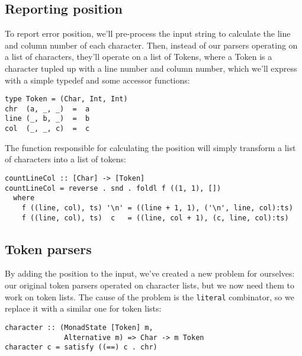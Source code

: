 \documentclass{tmr}
\begin{document}
\subsection{Reporting position}
To report error position, we'll pre-process the input
string to calculate the line and column number of each character.  Then, instead 
of our parsers operating on a list of characters, they'll operate on a list of 
Tokens, where a Token is a character tupled up with a line number and column 
number, which we'll express with a simple typedef and some accessor functions:
\begin{verbatim}
type Token = (Char, Int, Int)
chr  (a, _, _)  =  a
line (_, b, _)  =  b
col  (_, _, c)  =  c
\end{verbatim}
The function responsible for calculating the position will simply transform a 
list of characters into a list of tokens:
\begin{verbatim}
countLineCol :: [Char] -> [Token]
countLineCol = reverse . snd . foldl f ((1, 1), [])
  where
    f ((line, col), ts) '\n' = ((line + 1, 1), ('\n', line, col):ts)
    f ((line, col), ts)  c   = ((line, col + 1), (c, line, col):ts)
\end{verbatim}

\subsection{Token parsers}
By adding the position to the input, we've created a new problem 
for ourselves: our original token parsers operated on 
character lists, but we now need them to work on token lists.  
The cause of the problem is the \verb+literal+ combinator, so we
replace it with a similar one for token lists:
\begin{verbatim}
character :: (MonadState [Token] m, 
              Alternative m) => Char -> m Token
character c = satisfy ((==) c . chr)
\end{verbatim}
\end{document}

